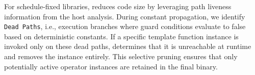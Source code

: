 For schedule-fixed libraries, \mysys reduces code size by leveraging path liveness information from the host analysis.
During constant propagation, we identify \texttt{Dead Paths}, i.e., execution branches where guard conditions evaluate to false based on deterministic constants.
If a specific template function instance is invoked only on these dead paths, \mysys determines that it is unreachable at runtime and removes the instance entirely.
This selective pruning ensures that only potentially active operator instances are retained in the final binary.
